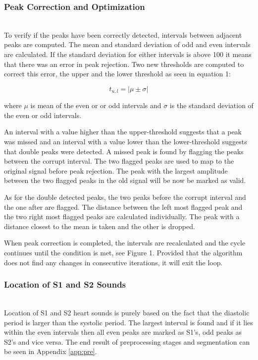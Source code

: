 \documentclass[10pt,twocolumn]{witseiepaper}
\begin{document}
\subsubsection{Peak Correction and Optimization}
\textcolor{white}{.................}\\
To verify if the peaks have been correctly detected, intervals between adjacent peaks are computed. The mean and standard deviation of odd and even intervals are calculated. If the standard deviation for either intervals is above 100 it means that there was an error in peak rejection. Two new thresholds are computed to correct this error, the upper and the lower threshold as seen in equation 1:

\begin{equation}
    t_{u,l} = |\mu\pm\sigma|
\end{equation}

where \(\mu\) is mean of the even or or odd intervals and \(\sigma\) is the standard deviation of the even or odd intervals.

An interval with a value higher than the upper-threshold suggests that a peak was missed and an interval with a value lower than the lower-threshold suggests that double peaks were detected. A missed peak is found by flagging the peaks between the corrupt interval. The two flagged peaks are used to map to the original signal before peak rejection. The peak with the largest amplitude between the two flagged peaks in the old signal will be now be marked as valid. 

As for the double detected peaks, the two peaks before the corrupt interval and the one after are flagged. The distance between the left most flagged peak and the two right most flagged peaks are calculated individually. The peak with a distance closest to the mean is taken and the other is dropped.

When peak correction is completed, the intervals are recalculated and the cycle continues until the condition is met, see Figure 1. Provided that the algorithm does not find any changes in consecutive iterations, it will exit the loop.

\subsubsection{Location of S1 and S2 Sounds}
\textcolor{white}{.................}\\
Location of S1 and S2 heart sounds is purely based on the fact that the diastolic period is larger than the systolic period. The largest interval is found and if it lies within the even intervals then all even peaks are marked as S1's, odd peaks as S2's and vice versa. The end result of preprocessing stages and segmentation can be seen in Appendix \ref{app:pre}.
\end{document}
